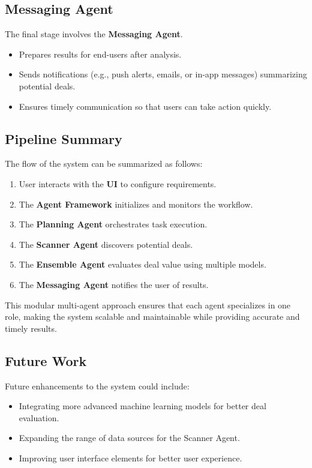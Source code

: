 \subsection{Messaging Agent}

The final stage involves the \textbf{Messaging Agent}.
\begin{itemize}
    \item Prepares results for end-users after analysis.  
    \item Sends notifications (e.g., push alerts, emails, or in-app messages) summarizing potential deals.  
    \item Ensures timely communication so that users can take action quickly.  
\end{itemize}

\subsection{Pipeline Summary}
The flow of the system can be summarized as follows:
\begin{enumerate}
    \item User interacts with the \textbf{UI} to configure requirements.  
    \item The \textbf{Agent Framework} initializes and monitors the workflow.  
    \item The \textbf{Planning Agent} orchestrates task execution.  
    \item The \textbf{Scanner Agent} discovers potential deals.  
    \item The \textbf{Ensemble Agent} evaluates deal value using multiple models.  
    \item The \textbf{Messaging Agent} notifies the user of results.  
\end{enumerate}

This modular multi-agent approach ensures that each agent specializes in one role, making the system scalable and maintainable while providing accurate and timely results.

\subsection{Future Work}

Future enhancements to the system could include:
\begin{itemize}
    \item Integrating more advanced machine learning models for better deal evaluation.
    \item Expanding the range of data sources for the Scanner Agent.
    \item Improving user interface elements for better user experience.
\end{itemize}
\vspace{2cm}

